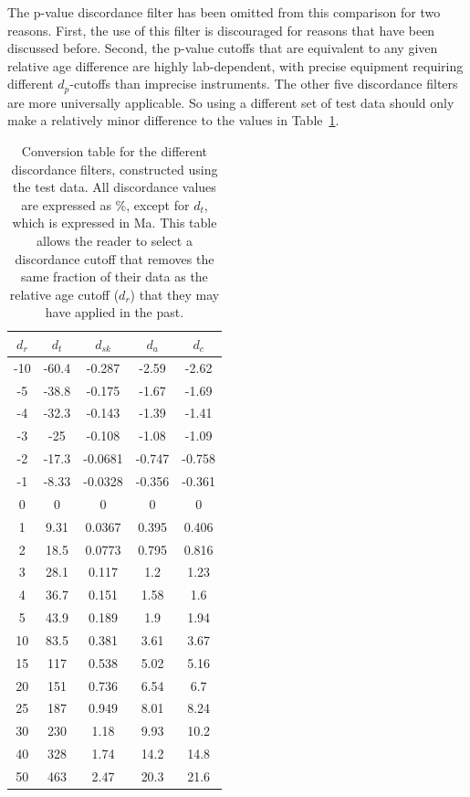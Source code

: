 \documentclass[gchron, manuscript]{copernicus}
\begin{document}
The p-value discordance filter has been omitted from this comparison
for two reasons. First, the use of this filter is discouraged for
reasons that have been discussed before. Second, the p-value cutoffs
that are equivalent to any given relative age difference are highly
lab-dependent, with precise equipment requiring different
$d_p$-cutoffs than imprecise instruments. The other five discordance
filters are more universally applicable. So using a different set of
test data should only make a relatively minor difference to the values
in Table~\ref{tab:conversiontable}.

\begin{table}
  \begin{minipage}[c]{0.45\textwidth}
  \begin{tabular}{c|cccc}
    $d_r$ & $d_t$ & $d_{sk}$ & $d_a$ & $d_c$ \\ \hline
-10 & -60.4 & -0.287 & -2.59 & -2.62 \\
-5 & -38.8 & -0.175 & -1.67 & -1.69 \\
-4 & -32.3 & -0.143 & -1.39 & -1.41 \\
-3 & -25 & -0.108 & -1.08 & -1.09 \\
-2 & -17.3 & -0.0681 & -0.747 & -0.758 \\
-1 & -8.33 & -0.0328 & -0.356 & -0.361 \\
0 & 0 & 0 & 0 & 0 \\
1 & 9.31 & 0.0367 & 0.395 & 0.406 \\
2 & 18.5 & 0.0773 & 0.795 & 0.816 \\
3 & 28.1 & 0.117 & 1.2 & 1.23 \\
4 & 36.7 & 0.151 & 1.58 & 1.6 \\
5 & 43.9 & 0.189 & 1.9 & 1.94 \\
10 & 83.5 & 0.381 & 3.61 & 3.67 \\
15 & 117 & 0.538 & 5.02 & 5.16 \\
20 & 151 & 0.736 & 6.54 & 6.7 \\
25 & 187 & 0.949 & 8.01 & 8.24 \\
30 & 230 & 1.18 & 9.93 & 10.2 \\
40 & 328 & 1.74 & 14.2 & 14.8 \\
50 & 463 & 2.47 & 20.3 & 21.6 \\
  \end{tabular}
  \end{minipage}
  \begin{minipage}[c]{0.5\textwidth}
  \caption{Conversion table for the different discordance filters,
    constructed using the test data. All discordance values are
    expressed as \%, except for $d_t$, which is expressed in Ma. This
    table allows the reader to select a discordance cutoff that
    removes the same fraction of their data as the relative age cutoff
    ($d_r$) that they may have applied in the past. }
  \label{tab:conversiontable}
  \end{minipage}
\end{table}
\end{document}
